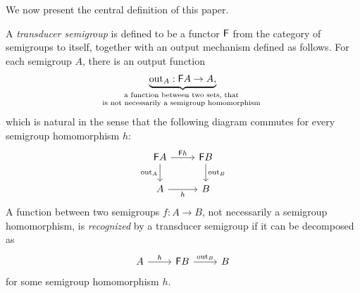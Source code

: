  
 
 We now present the central definition of this paper. 

\newcommand{\emptytester}{2}
\begin{definition}
    A \emph{transducer semigroup} is defined to be a functor $\mathsf F$ 
    from the category of semigroups to itself, together with an output mechanism defined as follows. For each semigroup $A$, there is an output function 
    \begin{align*}
    \myunderbrace{\outfun_A : \functor A \to A,}{a function between two sets, that \\ is not necessarily a semigroup homomorphism}
    \end{align*}
    which is natural in the sense that the following diagram commutes for every semigroup homomorphism $h$: 
    \[
    \begin{tikzcd}
    \functor A 
    \ar[r,"\functor h"]
    \ar[d,"\outfun_A"']
    &
    \functor B
    \ar[d,"\outfun_B"]
    \\
    A 
    \ar[r,"h"']
    &
    B
    \end{tikzcd}
    \]
    A function between two semigroups $f : A \to B$, not necessarily a semigroup homomorphism, is  \emph{recognized} by a transducer semigroup if it can be decomposed as 
    \[
        \begin{tikzcd}
        A 
        \ar[r,"h"]
        &
        \functor B
        \ar[r,"\outfun_B"]
        &
        B
        \end{tikzcd}
        \]
        for some  semigroup homomorphism $h$.
\end{definition}

